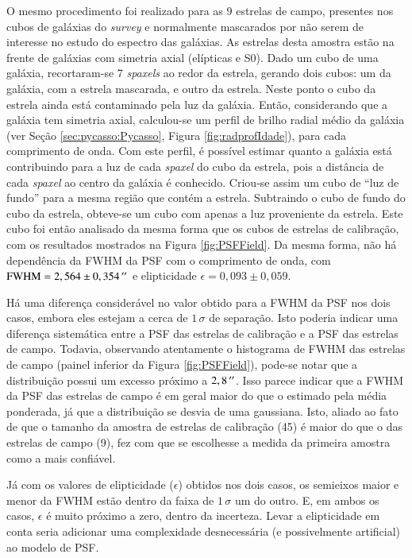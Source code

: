 O mesmo procedimento foi realizado para as 9 estrelas de campo, presentes nos
cubos de galáxias do {\em survey} e normalmente mascarados por não serem de
interesse no estudo do espectro das galáxias. As estrelas desta amostra estão na
frente de galáxias com simetria axial (elípticas e S0). Dado um cubo de uma
galáxia, recortaram-se 7 {\em spaxels} ao redor da estrela, gerando dois cubos:
um da galáxia, com a estrela mascarada, e outro da estrela. Neste ponto o cubo da
estrela ainda está contaminado pela luz da galáxia. Então, considerando que a
galáxia tem simetria axial, calculou-se um perfil de brilho radial médio da
galáxia (ver Seção \ref{sec:pycasso:Pycasso}, Figura \ref{fig:radprofIdade}),
para cada comprimento de onda. Com este perfil, é possível estimar quanto a
galáxia está contribuindo para a luz de cada {\em spaxel} do cubo da estrela,
pois a distância de cada {\em spaxel} ao centro da galáxia é conhecido. Criou-se
assim um cubo de ``luz de fundo'' para a mesma região que contém a estrela.
Subtraindo o cubo de fundo do cubo da estrela, obteve-se um cubo com apenas a
luz proveniente da estrela. Este cubo foi então analisado da mesma forma que os
cubos de estrelas de calibração, com os resultados mostrados na Figura
\ref{fig:PSFField}. Da mesma forma, não há dependência da FWHM da PSF com o
comprimento de onda, com $\mathrm{FWHM}=2,564 \pm 0,354\,^{\prime\prime}$ e elipticidade
$\epsilon=0,093 \pm 0,059$.


Há uma diferença considerável no valor obtido para a FWHM da PSF nos dois casos,
embora eles estejam a cerca de $1\,\sigma$ de separação. Isto poderia indicar
uma diferença sistemática entre a PSF das estrelas de calibração e a PSF das
estrelas de campo. Todavia, observando atentamente o histograma de FWHM das
estrelas de campo (painel inferior da Figura \ref{fig:PSFField}), pode-se notar
que a distribuição possui um excesso próximo a $2,8\,^{\prime\prime}$. Isso parece indicar
que a FWHM da PSF das estrelas de campo é em geral maior do que o estimado pela
média ponderada, já que a distribuição se desvia de uma gaussiana. Isto, aliado
ao fato de que o tamanho da amostra de estrelas de calibração (45) é maior do
que o das estrelas de campo (9), fez com que se escolhesse a medida da primeira
amostra como a mais confiável.

Já com os valores de elipticidade ($\epsilon$) obtidos nos dois casos, os
semieixos maior e menor da FWHM estão dentro da faixa de $1\,\sigma$ um do
outro. E, em ambos os casos, $\epsilon$ é muito próximo a zero, dentro da
incerteza. Levar a elipticidade em conta seria adicionar uma complexidade
desnecessária (e possivelmente artificial) ao modelo de PSF.

